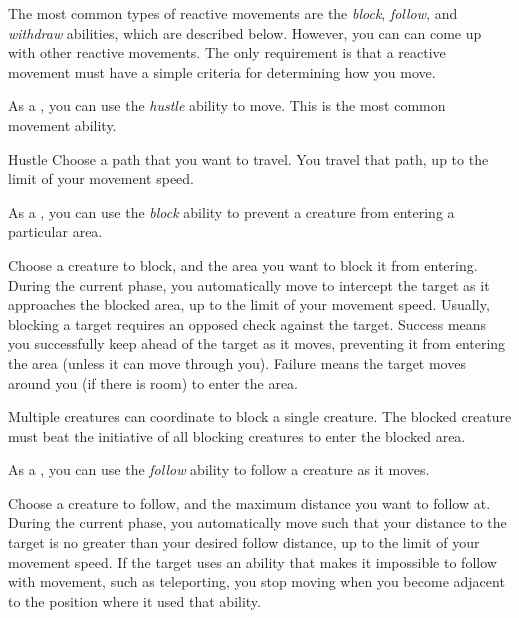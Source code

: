         The most common types of reactive movements are the \textit{block}, \textit{follow}, and \textit{withdraw} abilities, which are described below.
        However, you can can come up with other reactive movements.
        The only requirement is that a reactive movement must have a simple criteria for determining how you move.

         As a , you can use the \textit{hustle} ability to move.
        This is the most common movement ability.

        \begin{ability}{Hustle}
            Choose a path that you want to travel.  You travel that path, up to the limit of your movement speed.
        \end{ability}

         As a , you can use the \textit{block} ability to prevent a creature from entering a particular area.

        \begin{ability}{}
            Choose a creature to block, and the area you want to block it from entering.
            During the current phase, you automatically move to intercept the target as it approaches the blocked area, up to the limit of your movement speed.
            Usually, blocking a target requires an opposed  check against the target.
            Success means you successfully keep ahead of the target as it moves, preventing it from entering the area (unless it can move through you).
            Failure means the target moves around you (if there is room) to enter the area.

            Multiple creatures can coordinate to block a single creature.
            The blocked creature must beat the initiative of all blocking creatures to enter the blocked area.
        \end{ability}

         As a , you can use the \textit{follow} ability to follow a creature as it moves.

        \begin{ability}{}
            Choose a creature to follow, and the maximum distance you want to follow at.
            During the current phase, you automatically move such that your distance to the target is no greater than your desired follow distance, up to the limit of your movement speed.
            If the target uses an ability that makes it impossible to follow with movement, such as teleporting, you stop moving when you become adjacent to the position where it used that ability.
        \end{ability}

